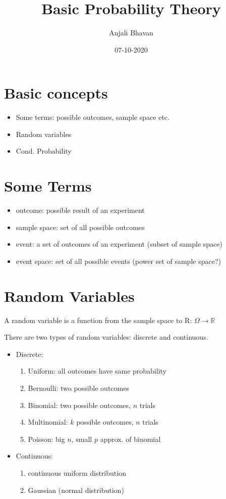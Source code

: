 \documentclass{article}
\title{Basic Probability Theory}
\date{07-10-2020}
\author{Anjali Bhavan}
\begin{document}
\maketitle
\section{Basic concepts}
\begin{itemize}
    \item Some terms: possible outcomes, sample space etc.
    \item Random variables
    \item Cond. Probability
\end{itemize}
\section{Some Terms}
\begin{itemize}
    \item outcome: possible result of an experiment 
    \item sample space: set of all possible outcomes
    \item event: a set of outcomes of an experiment (subset of sample
    space)
    \item event space: set of all possible events 
    (power set of sample space?)
\end{itemize}
\section{Random Variables}
\begin{definition}
A random variable is a function from the sample space to R: $\Omega \rightarrow \mathbb{R}$ 
\end{definition}

There are two types of random variables: discrete and continuous.
\begin{itemize}
    \item Discrete:
    \begin{enumerate}[label=(\alph*)]
        \item Uniform: all outcomes have same probability
        \item Bernoulli: two possible outcomes
        \item Binomial: two possible outcomes, $n$ trials
        \item Multinomial: $k$ possible outcomes, $n$ trials
        \item Poisson: big $n$, small $p$ approx. of binomial
    \end{enumerate}
    \item Continuous:
    \begin{enumerate}[label=(\alph*)]
        \item continuous uniform distribution
        \item Gaussian (normal distribution)
    \end{enumerate}
\end{itemize}
\end{document}
